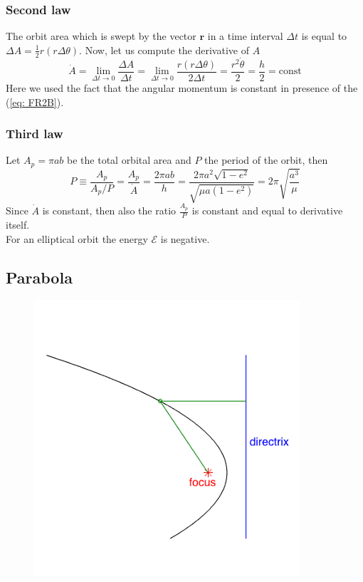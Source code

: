 \subsubsection{Second law}
The orbit area which is swept by the vector $\mathbf{r}$ in a time interval $\Delta t$ is equal to $\Delta A =\frac{1}{2}r (r\Delta \theta)$. Now, let us compute the derivative of $A$
\begin{equation*}
    \dot{A} = \lim_{\Delta t \to 0}\frac{\Delta A}{\Delta t} = 
    \lim_{\Delta t \to 0}\frac{r (r\Delta \theta)}{2\Delta t} = 
    \frac{r^2\dot{\theta}}{2} = \frac{h}{2} = \text{const}
\end{equation*}
Here we used the fact that the angular momentum is constant in presence of the (\ref{eq: FR2B}).

\subsubsection{Third law}
Let $A_p=\pi a b$ be the total orbital area and $P$ the period of the orbit, then 
\begin{equation*}
    P \equiv \frac{A_p}{A_p/P} = \frac{A_p}{\dot{A}}=
    \frac{2\pi a b}{h} = \frac{2\pi a^2 \sqrt{1-e^2}}{\sqrt{\mu a (1-e^2)}} = 2\pi \sqrt{\frac{a^3}{\mu}}
\end{equation*}
Since $\dot{A}$ is constant, then also the ratio $\frac{A_p}{P}$ is constant and equal to derivative itself.\\
For an elliptical orbit the energy $\mathcal{E}$ is negative.


\subsection{Parabola}
\begin{figure}[h]
    \centering
    \includegraphics[scale=0.6]{AerospaceApplications/images/parabola.png}
\end{figure}


